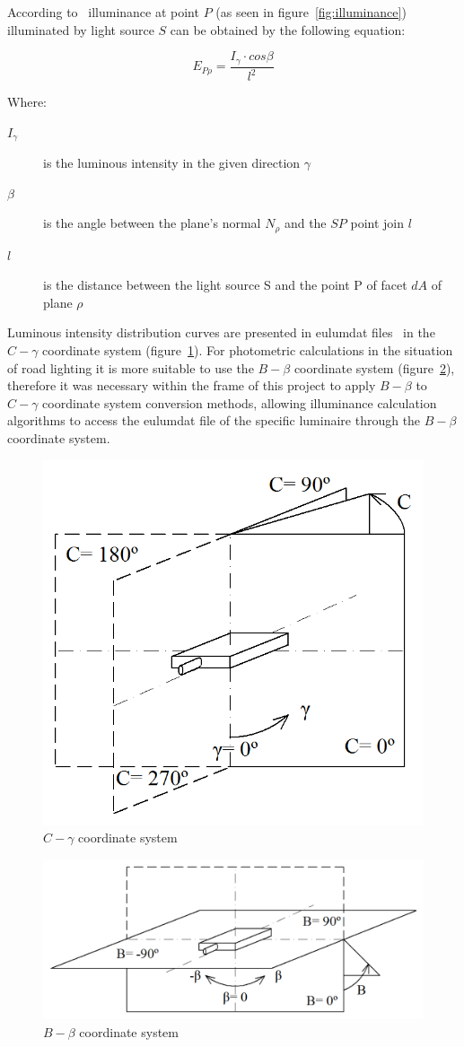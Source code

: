 According to~\cite{Habel} illuminance at point $P$ (as seen in figure~\ref{fig:illuminance}) illuminated by light source $S$ can be obtained by the following equation:

\begin{equation}
E_{P\rho}=\frac{I_{\gamma} \cdot cos \beta}{l^2}
\end{equation}

Where:
\begin{description}
	\item[$I_{\gamma}$] is the luminous intensity in the given direction $\gamma$
	\item[$\beta$] is the angle between the plane's normal $N_{\rho}$ and the $SP$ point join $l$
	\item[$l$] is the distance between the light source S and the point P of facet $dA$ of plane $\rho$
\end{description}

Luminous intensity distribution curves are presented in eulumdat files~\cite{Eulumdat} in the $C-\gamma$ coordinate system (figure~\ref{fig:Cgamma}). For photometric calculations in the situation of road lighting it is more suitable to use the $B-\beta$ coordinate system (figure~\ref{fig:Bbeta}), therefore it was necessary within the frame of this project to apply $B-\beta$ to $C-\gamma$ coordinate system conversion methods, allowing illuminance calculation algorithms to access the eulumdat file of the specific luminaire through the $B-\beta$ coordinate system.

\begin{figure}[htb]
  \centering
  \includegraphics[width=0.65\columnwidth]{Cgama}
  \caption{$C-\gamma$ coordinate system}
  \label{fig:Cgamma}
\end{figure}

\begin{figure}[htb]
  \centering
  \includegraphics[width=\columnwidth]{Bbeta}
  \caption{$B-\beta$ coordinate system}
  \label{fig:Bbeta}
\end{figure}
